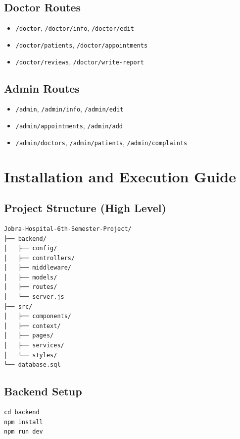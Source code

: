 \documentclass[12pt,a4paper]{article}
\begin{document}
\subsection{Doctor Routes}
\begin{itemize}[leftmargin=1.2cm]
    \item \texttt{/doctor}, \texttt{/doctor/info}, \texttt{/doctor/edit}
    \item \texttt{/doctor/patients}, \texttt{/doctor/appointments}
    \item \texttt{/doctor/reviews}, \texttt{/doctor/write-report}
\end{itemize}

\subsection{Admin Routes}
\begin{itemize}[leftmargin=1.2cm]
    \item \texttt{/admin}, \texttt{/admin/info}, \texttt{/admin/edit}
    \item \texttt{/admin/appointments}, \texttt{/admin/add}
    \item \texttt{/admin/doctors}, \texttt{/admin/patients}, \texttt{/admin/complaints}
\end{itemize}

\section{Installation and Execution Guide}
\subsection{Project Structure (High Level)}
\begin{verbatim}
Jobra-Hospital-6th-Semester-Project/
├── backend/
│   ├── config/
│   ├── controllers/
│   ├── middleware/
│   ├── models/
│   ├── routes/
│   └── server.js
├── src/
│   ├── components/
│   ├── context/
│   ├── pages/
│   ├── services/
│   └── styles/
└── database.sql
\end{verbatim}

\subsection{Backend Setup}
\begin{verbatim}
cd backend
npm install
npm run dev
\end{verbatim}
\end{document}
